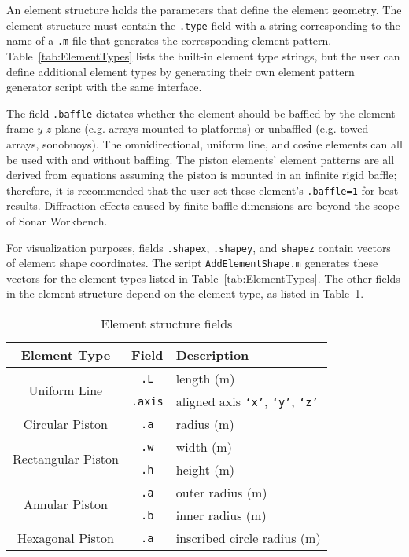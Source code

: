 An element structure holds the parameters that define the element geometry. The element structure must contain the \texttt{.type} field with a string corresponding to the name of a \texttt{.m} file that generates the corresponding element pattern. Table~\ref{tab:ElementTypes} lists the built-in element type strings, but the user can define additional element types by generating their own element pattern generator script with the same interface. 

The field \texttt{.baffle} dictates whether the element should be baffled by the element frame $y$-$z$ plane (e.g. arrays mounted to platforms) or unbaffled (e.g. towed arrays, sonobuoys). The omnidirectional, uniform line, and cosine elements can all be used with and without baffling. The piston elements' element patterns are all derived from equations assuming the piston is mounted in an infinite rigid baffle; therefore, it is recommended that the user set these element's \texttt{.baffle=1} for best results. Diffraction effects caused by finite baffle dimensions are beyond the scope of Sonar Workbench. 

For visualization purposes, fields \texttt{.shapex}, \texttt{.shapey}, and \texttt{shapez} contain vectors of element shape coordinates. The script \texttt{AddElementShape.m} generates these vectors for the element types listed in Table~\ref{tab:ElementTypes}. The other fields in the element structure depend on the element type, as listed in Table~\ref{tab:ElementFields}.

\begin{table}[!ht]
	\begin{center}
		\caption{Element structure fields}
		\label{tab:ElementFields}
		\begin{tabular}{c|c|l} 
			\textbf{Element Type} & \textbf{Field} & \textbf{Description} \\
			\hline
			\multirow{2}{*}{Uniform Line} & \texttt{.L} & length (m) \\
			& \texttt{.axis} & aligned axis \texttt{`x'}, \texttt{`y'}, \texttt{`z'} \\
			\hline
			Circular Piston & \texttt{.a} & radius (m) \\
			\hline
			\multirow{2}{*}{Rectangular Piston} & \texttt{.w} & width (m) \\
			& \texttt{.h} & height (m) \\
			\hline
			\multirow{2}{*}{Annular Piston} & \texttt{.a} & outer radius (m) \\
			& \texttt{.b} & inner radius (m) \\
			\hline
			Hexagonal Piston & \texttt{.a} & inscribed circle radius (m) \\	
		\end{tabular}
	\end{center}
\end{table}


